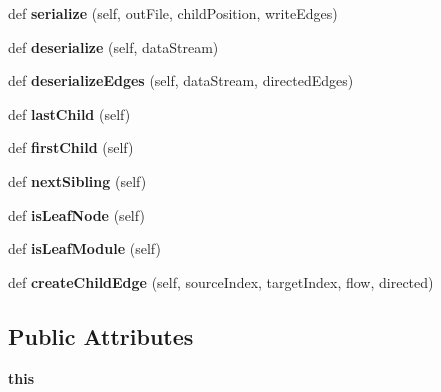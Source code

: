 \begin{DoxyCompactItemize}
def {\bfseries serialize} (self, out\+File, child\+Position, write\+Edges)
\item 
\mbox{\label{classinfomap_1_1TreeIterator_ad3903969c6b445bbd062ee52b825ce13}} 
def {\bfseries deserialize} (self, data\+Stream)
\item 
\mbox{\label{classinfomap_1_1TreeIterator_af3cdd6a635f3603366e47697ee64719a}} 
def {\bfseries deserialize\+Edges} (self, data\+Stream, directed\+Edges)
\item 
\mbox{\label{classinfomap_1_1TreeIterator_a28517d870ad5d05e8e4d86b1e7d790c6}} 
def {\bfseries last\+Child} (self)
\item 
\mbox{\label{classinfomap_1_1TreeIterator_a4b6cc506a85fedcb22b80e00edb9acd5}} 
def {\bfseries first\+Child} (self)
\item 
\mbox{\label{classinfomap_1_1TreeIterator_abb1b5b7cafcb42cbdb8d89d313e56567}} 
def {\bfseries next\+Sibling} (self)
\item 
\mbox{\label{classinfomap_1_1TreeIterator_ae5486e89034d3a7e4c22f9598dd14d30}} 
def {\bfseries is\+Leaf\+Node} (self)
\item 
\mbox{\label{classinfomap_1_1TreeIterator_a9ddc45508b8636192523dc362b9be30a}} 
def {\bfseries is\+Leaf\+Module} (self)
\item 
\mbox{\label{classinfomap_1_1TreeIterator_aa452327104bb969a5b3a6f921270d8b2}} 
def {\bfseries create\+Child\+Edge} (self, source\+Index, target\+Index, flow, directed)
\end{DoxyCompactItemize}
\subsection*{Public Attributes}
\begin{DoxyCompactItemize}
\item 
\mbox{\label{classinfomap_1_1TreeIterator_ab9fa71c2c5b56c1db62043c3e0de0e01}} 
{\bfseries this}
\end{DoxyCompactItemize}

